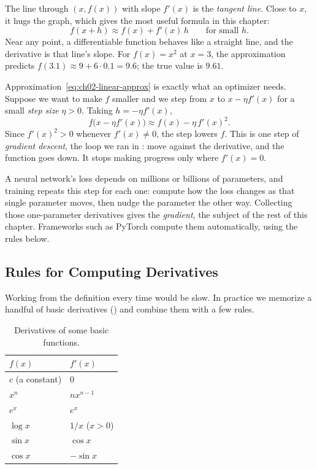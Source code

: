 The line through $(x, f(x))$ with slope $f'(x)$ is the \emph{tangent line}.
Close to $x$, it hugs the graph, which gives the most useful formula in
this chapter:
\begin{equation}
  f(x + h) \approx f(x) + f'(x)\, h \qquad \text{for small } h.
  \label{eq:ch02-linear-approx}
\end{equation}
Near any point, a differentiable function behaves like a straight line,
and the derivative is that line's slope. For $f(x) = x^2$ at $x = 3$, the
approximation predicts $f(3.1) \approx 9 + 6 \cdot 0.1 = 9.6$; the true
value is $9.61$.

Approximation~\eqref{eq:ch02-linear-approx} is exactly what an optimizer
needs. Suppose we want to make $f$ smaller and we step from $x$ to
$x - \eta f'(x)$ for a small \emph{step size} $\eta > 0$. Taking
$h = -\eta f'(x)$,
\[
  f\bigl(x - \eta f'(x)\bigr) \approx f(x) - \eta \, f'(x)^2 .
\]
Since $f'(x)^2 > 0$ whenever $f'(x) \ne 0$, the step lowers $f$. This is
one step of \emph{gradient descent}, the loop we ran in
: move against the derivative, and the
function goes down. It stops making progress only where $f'(x) = 0$.

\begin{aibox}
  A neural network's loss depends on millions or billions of parameters,
  and training repeats this step for each one: compute how the loss
  changes as that single parameter moves, then nudge the parameter the
  other way. Collecting those one-parameter derivatives gives the
  \emph{gradient}, the subject of the rest of this chapter. Frameworks such
  as PyTorch compute them automatically, using the rules below.
\end{aibox}

\subsection{Rules for Computing Derivatives}
\label{sec:ch02-rules}

Working from the definition every time would be slow. In practice we
memorize a handful of basic derivatives () and
combine them with a few rules.

\begin{table}[ht]
  \centering
  \caption{Derivatives of some basic functions.}
  \label{tab:ch02-derivatives}
  \begin{tabular}{@{}ll@{}}
    \toprule
    $f(x)$ & $f'(x)$ \\
    \midrule
    $c$ (a constant) & $0$ \\
    $x^n$ & $n x^{n-1}$ \\
    $e^x$ & $e^x$ \\
    $\log x$ & $1/x$ \quad ($x > 0$) \\
    $\sin x$ & $\cos x$ \\
    $\cos x$ & $-\sin x$ \\
    \bottomrule
  \end{tabular}
\end{table}

